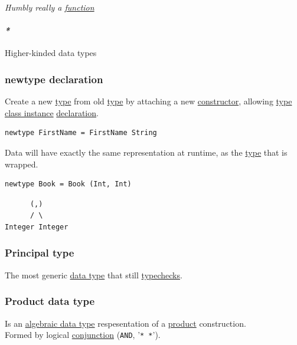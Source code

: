 \documentclass[11pt]{article}
\begin{document}
\emph{Humbly really a \hyperref[orge15bc14]{function}}\\

\paragraph{\emph{*}}
\label{sec:org66f4072}

\label{orge5c2c94}Higher-kinded data types\\

\subsubsection{\label{orgeb16baa}newtype declaration}
\label{sec:org78a5a88}
Create a new \hyperref[orgc4aea2f]{type} from old \hyperref[orgc4aea2f]{type} by attaching a new \hyperref[orgf4d811d]{constructor}, allowing \hyperref[org5d45c00]{type class instance} \hyperref[org8fbd848]{declaration}.\\
\begin{verbatim}
newtype FirstName = FirstName String
\end{verbatim}

Data will have exactly the same representation at runtime, as the \hyperref[orgc4aea2f]{type} that is wrapped.\\

\begin{verbatim}
newtype Book = Book (Int, Int)
\end{verbatim}
\begin{verbatim}
      (,)
      / \
Integer Integer
\end{verbatim}

\subsubsection{\label{orgf0dc82f}Principal type}
\label{sec:org8067595}
The most generic \hyperref[org212d9c3]{data type} that still \hyperref[org1f5fd94]{typechecks}.\\

\subsubsection{\label{org0f6a587}Product data type}
\label{sec:org9600670}
Is an \hyperref[org2278a14]{algebraic data type} respesentation of a \hyperref[org80a0b6e]{product} construction.\\
Formed by logical \hyperref[orgc8fbabd]{conjunction} (\texttt{AND}, '\texttt{* *}').\\
\end{document}
